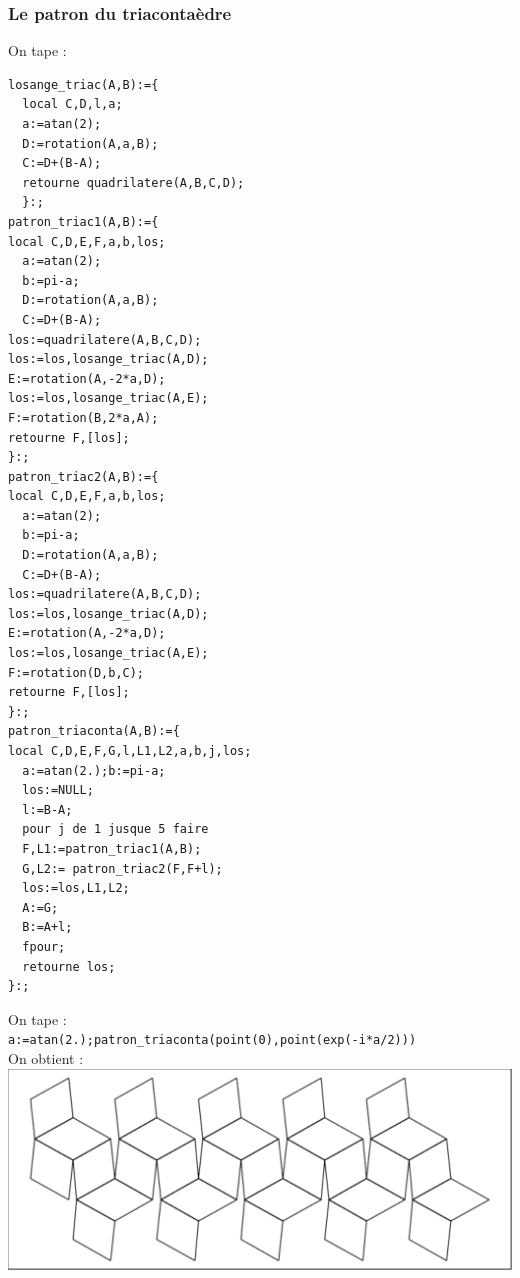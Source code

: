 \documentclass[a4paper,11pt]{book}
\begin{document}
\subsubsection{Le patron du triaconta\`edre}
On tape :
\begin{verbatim}
losange_triac(A,B):={
  local C,D,l,a;
  a:=atan(2);
  D:=rotation(A,a,B);
  C:=D+(B-A);
  retourne quadrilatere(A,B,C,D);
  }:;
patron_triac1(A,B):={
local C,D,E,F,a,b,los;
  a:=atan(2);
  b:=pi-a;
  D:=rotation(A,a,B);
  C:=D+(B-A);
los:=quadrilatere(A,B,C,D);
los:=los,losange_triac(A,D);
E:=rotation(A,-2*a,D);
los:=los,losange_triac(A,E);
F:=rotation(B,2*a,A);
retourne F,[los];
}:;
patron_triac2(A,B):={
local C,D,E,F,a,b,los;
  a:=atan(2);
  b:=pi-a;
  D:=rotation(A,a,B);
  C:=D+(B-A);
los:=quadrilatere(A,B,C,D);
los:=los,losange_triac(A,D);
E:=rotation(A,-2*a,D);
los:=los,losange_triac(A,E);
F:=rotation(D,b,C);
retourne F,[los];
}:;
patron_triaconta(A,B):={
local C,D,E,F,G,l,L1,L2,a,b,j,los;
  a:=atan(2.);b:=pi-a;
  los:=NULL;
  l:=B-A;
  pour j de 1 jusque 5 faire 
  F,L1:=patron_triac1(A,B);
  G,L2:= patron_triac2(F,F+l);
  los:=los,L1,L2;
  A:=G;
  B:=A+l;
  fpour;
  retourne los;
}:;
\end{verbatim}
On tape :\\
{\tt a:=atan(2.);patron\_triaconta(point(0),point(exp(-i*a/2)))}\\
On obtient :\\
\includegraphics[width=\textwidth]{patrontriacon}\\
\end{document}
